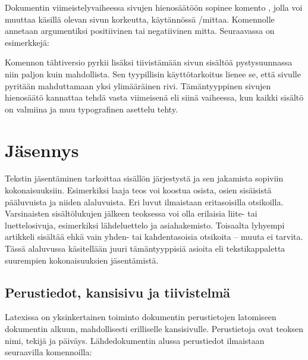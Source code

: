 Dokumentin viimeistelyvaiheessa sivujen hienosäätöön sopinee komento
, jolla voi muuttaa käsillä olevan sivun
korkeutta, käytännössä \-/mittaa. Komennolle annetaan
argumentiksi positiivinen tai negatiivinen mitta. Seuraavassa on
esimerkkejä:

\begin{koodilohkosis}
\enlargethispage{12bp}          %
\enlargethispage{-4bp}          %
\enlargethispage{\baselineskip} %
\end{koodilohkosis}

Komennon tähtiversio  pyrkii lisäksi
tiivistämään sivun sisältöä pystysuunnassa niin paljon kuin mahdollista.
Sen tyypillisin käyttötarkoitus lienee se, että sivulle pyritään
mahduttamaan yksi ylimääräinen rivi. Tämäntyyppinen sivujen hienosäätö
kannattaa tehdä vasta viimeisenä eli siinä vaiheessa, kun kaikki sisältö
on valmiina ja muu typografinen asettelu tehty.

\section{Jäsennys}
\label{luku/jäsennys}

Tekstin jäsentäminen tarkoittaa sisällön järjestystä ja sen jakamista
sopiviin kokonaisuuksiin. Esimerkiksi laaja teos voi koostua osista,
osien sisäisistä pääluvuista ja niiden alaluvuista. Eri luvut ilmaistaan
eritasoisilla otsikoilla. Varsinaisten sisältölukujen jälkeen teoksessa
voi olla erilaisia liite- tai luettelosivuja, esimerkiksi lähdeluettelo
ja asiahakemisto. Toisaalta lyhyempi artikkeli sisältää ehkä vain yhden-
tai kahdentasoisia otsikoita -- muuta ei tarvita. Tässä alaluvussa
käsitellään juuri tämäntyyppisiä asioita eli tekstikappaletta suurempien
kokonaisuuksien jäsentämistä.

\subsection{Perustiedot, kansisivu ja tiivistelmä}
\label{luku/dokumentin-perustiedot}

Latexissa on yksinkertainen toiminto dokumentin perustietojen latomiseen
dokumentin alkuun, mahdollisesti erilliselle kansisivulle. Perustietoja
ovat teoksen nimi, tekijä ja päiväys. Lähdedokumentin alussa perustiedot
ilmaistaan seuraavilla komennoilla:

